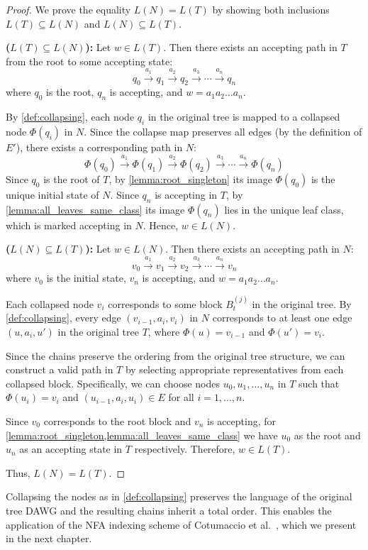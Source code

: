 \begin{proof}
    We prove the equality $L(N) = L(T)$ by showing both inclusions $L(T) \subseteq L(N)$ and $L(N) \subseteq L(T)$.

    \textbf{($L(T) \subseteq L(N)$):} Let $w \in L(T)$. Then there exists an accepting path in $T$ from the root to some accepting state:
    \[
        q_0 \xrightarrow{a_1} q_1 \xrightarrow{a_2} q_2 \xrightarrow{a_3} \cdots \xrightarrow{a_n} q_n
    \]
    where $q_0$ is the root, $q_n$ is accepting, and $w = a_1a_2\ldots a_n$.

    By \cref{def:collapsing}, each node $q_i$ in the original tree is mapped to a collapsed node $\Phi(q_i)$ in $N$. Since the collapse map preserves all edges (by the definition of $E'$), there exists a corresponding path in $N$:
    \[
        \Phi(q_0) \xrightarrow{a_1} \Phi(q_1) \xrightarrow{a_2} \Phi(q_2) \xrightarrow{a_3} \cdots \xrightarrow{a_n} \Phi(q_n)
    \]
    Since $q_0$ is the root of $T$, by \cref{lemma:root_singleton} its image $\Phi(q_0)$ is the unique initial state of $N$. Since $q_n$ is accepting in $T$, by \cref{lemma:all_leaves_same_class} its image $\Phi(q_n)$ lies in the unique leaf class, which is marked accepting in $N$. Hence, $w \in L(N)$.

    \textbf{($L(N) \subseteq L(T)$):} Let $w \in L(N)$. Then there exists an accepting path in $N$:
    \[
        v_0 \xrightarrow{a_1} v_1 \xrightarrow{a_2} v_2 \xrightarrow{a_3} \cdots \xrightarrow{a_n} v_n
    \]
    where $v_0$ is the initial state, $v_n$ is accepting, and $w = a_1a_2\ldots a_n$.

    Each collapsed node $v_i$ corresponds to some block $B_t^{(j)}$ in the original tree. By \cref{def:collapsing}, every edge $(v_{i-1}, a_i, v_i)$ in $N$ corresponds to at least one edge $(u, a_i, u')$ in the original tree $T$, where $\Phi(u) = v_{i-1}$ and $\Phi(u') = v_i$.

    Since the chains preserve the ordering from the original tree structure, we can construct a valid path in $T$ by selecting appropriate representatives from each collapsed block. Specifically, we can choose nodes $u_0, u_1, \ldots, u_n$ in $T$ such that $\Phi(u_i) = v_i$ and $(u_{i-1}, a_i, u_i) \in E$ for all $i = 1, \ldots, n$.

    Since $v_0$ corresponds to the root block and $v_n$ is accepting, for \cref{lemma:root_singleton,lemma:all_leaves_same_class} we have $u_0$ as the root and $u_n$ as an accepting state in $T$ respectively. Therefore, $w \in L(T)$.

    Thus, $L(N) = L(T)$.
\end{proof}

Collapsing the nodes as in \cref{def:collapsing} preserves the language of the original tree DAWG and the resulting chains inherit a total order. This enables the application of the NFA indexing scheme of Cotumaccio et al.~\cite{cotumaccio2023co}, which we present in the next chapter.
